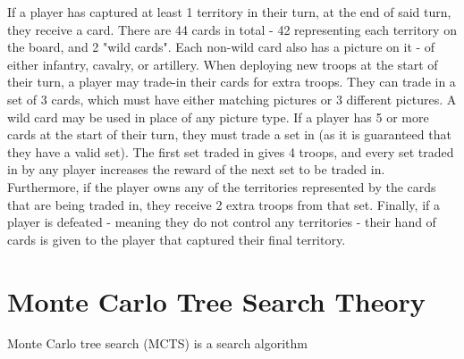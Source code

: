 If a player has captured at least 1 territory in their turn, at the end of said turn, they receive a card. There are 44 cards in total - 42 representing each territory on the board, and 2 "wild cards". Each non-wild card also has a picture on it - of either infantry, cavalry, or artillery. When deploying new troops at the start of their turn, a player may trade-in their cards for extra troops. They can trade in a set of 3 cards, which must have either matching pictures or 3 different pictures. A wild card may be used in place of any picture type. If a player has 5 or more cards at the start of their turn, they must trade a set in (as it is guaranteed that they have a valid set). The first set traded in gives 4 troops, and every set traded in by any player increases the reward of the next set to be traded in. Furthermore, if the player owns any of the territories represented by the cards that are being traded in, they receive 2 extra troops from that set. Finally, if a player is defeated - meaning they do not control any territories - their hand of cards is given to the player that captured their final territory.

\section{Monte Carlo Tree Search Theory}
\label{MCTSTheory}

Monte Carlo tree search (MCTS) \cite{Coulom2007MonteCarlo} is a search algorithm